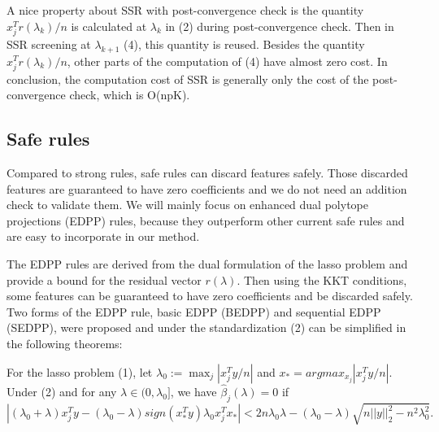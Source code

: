 A nice property about SSR with post-convergence check is the quantity $x_j^Tr(\lambda_k)/n$ is calculated at $\lambda_k$ in (2) during post-convergence check. Then in SSR screening at $\lambda_{k+1}$ (4), this quantity is reused. Besides the quantity $x_j^Tr(\lambda_k)/n$, other parts of the computation of (4) have almost zero cost. In conclusion, the computation cost of SSR is generally only the cost of the post-convergence check, which is O(npK).

\subsection{Safe rules}

Compared to strong rules, safe rules can discard features safely. Those discarded features are guaranteed to have zero coefficients and we do not need an addition check to validate them. We will mainly focus on enhanced dual polytope projections (EDPP) rules\citep{wang2013lasso}, because they outperform other current safe rules and are easy to incorporate in our method.

The EDPP rules are derived from the dual formulation of the lasso problem and provide a bound for the residual vector $r(\lambda)$. Then using the KKT conditions, some features can be guaranteed to have zero coefficients and be discarded safely. Two forms of the EDPP rule, basic EDPP (BEDPP) and sequential EDPP (SEDPP)\citep{wang2013lasso}, were proposed and under the standardization (2) can be simplified in the following theorems\citep{zeng2017efficient}:

\begin{theorem}[BEDPP]
    For the lasso problem (1), let $\lambda_0:=\max_j|x_j^Ty/n|$ and $x_*=argmax_{x_j}|x_j^Ty/n|$. Under (2) and for any $\lambda\in(0,\lambda_0]$, we have $\hat{\beta}_j(\lambda)=0$ if
    \begin{equation}
        |(\lambda_0+\lambda)x_j^Ty-(\lambda_0-\lambda)sign(x_*^Ty)\lambda_0x_j^Tx_*|<2n\lambda_0\lambda-(\lambda_0-\lambda)\sqrt{n||y||_2^2-n^2\lambda_0^2}.
    \end{equation}
\end{theorem}

